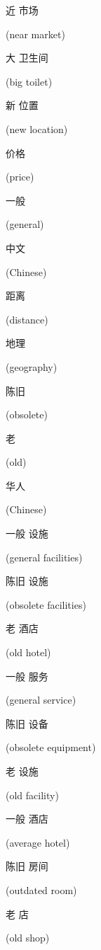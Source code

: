 \begin{CJK}{UTF8}{gbsn}近 市场\end{CJK} (near market)
\begin{CJK}{UTF8}{gbsn}大 卫生间\end{CJK} (big toilet)
\begin{CJK}{UTF8}{gbsn}新 位置\end{CJK} (new location)
\begin{CJK}{UTF8}{gbsn}价格\end{CJK} (price)
\begin{CJK}{UTF8}{gbsn}一般\end{CJK} (general)
\begin{CJK}{UTF8}{gbsn}中文\end{CJK} (Chinese)
\begin{CJK}{UTF8}{gbsn}距离\end{CJK} (distance)
\begin{CJK}{UTF8}{gbsn}地理\end{CJK} (geography)
\begin{CJK}{UTF8}{gbsn}陈旧\end{CJK} (obsolete)
\begin{CJK}{UTF8}{gbsn}老\end{CJK} (old)
\begin{CJK}{UTF8}{gbsn}华人\end{CJK} (Chinese)
\begin{CJK}{UTF8}{gbsn}一般 设施\end{CJK} (general facilities)
\begin{CJK}{UTF8}{gbsn}陈旧 设施\end{CJK} (obsolete facilities)
\begin{CJK}{UTF8}{gbsn}老 酒店\end{CJK} (old hotel)
\begin{CJK}{UTF8}{gbsn}一般 服务\end{CJK} (general service)
\begin{CJK}{UTF8}{gbsn}陈旧 设备\end{CJK} (obsolete equipment)
\begin{CJK}{UTF8}{gbsn}老 设施\end{CJK} (old facility)
\begin{CJK}{UTF8}{gbsn}一般 酒店\end{CJK} (average hotel)
\begin{CJK}{UTF8}{gbsn}陈旧 房间\end{CJK} (outdated room)
\begin{CJK}{UTF8}{gbsn}老 店\end{CJK} (old shop)

